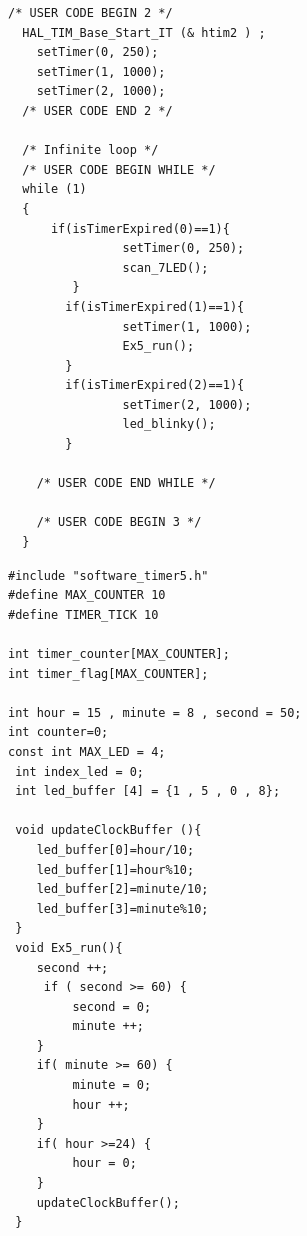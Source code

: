 \begin{lstlisting}[caption=main.c]
/* USER CODE BEGIN 2 */
  HAL_TIM_Base_Start_IT (& htim2 ) ;
    setTimer(0, 250);
    setTimer(1, 1000);
    setTimer(2, 1000);
  /* USER CODE END 2 */

  /* Infinite loop */
  /* USER CODE BEGIN WHILE */
  while (1)
  {
	  if(isTimerExpired(0)==1){
	  	 	  	setTimer(0, 250);
	  	 	  	scan_7LED();
	  	 }
	  	if(isTimerExpired(1)==1){
	  		  	setTimer(1, 1000);
	  		  	Ex5_run();
	  	}
	  	if(isTimerExpired(2)==1){
	  		  	setTimer(2, 1000);
	  		  	led_blinky();
	  	}

    /* USER CODE END WHILE */

    /* USER CODE BEGIN 3 */
  }
\end{lstlisting}
\begin{lstlisting}[caption=software$\_$timer5.c]
#include "software_timer5.h"
#define MAX_COUNTER 10
#define TIMER_TICK 10

int timer_counter[MAX_COUNTER];
int timer_flag[MAX_COUNTER];

int hour = 15 , minute = 8 , second = 50;
int counter=0;
const int MAX_LED = 4;
 int index_led = 0;
 int led_buffer [4] = {1 , 5 , 0 , 8};

 void updateClockBuffer (){
 	led_buffer[0]=hour/10;
 	led_buffer[1]=hour%10;
 	led_buffer[2]=minute/10;
 	led_buffer[3]=minute%10;
 }
 void Ex5_run(){
 	second ++;
 	 if ( second >= 60) {
 		 second = 0;
 		 minute ++;
 	}
 	if( minute >= 60) {
 		 minute = 0;
 		 hour ++;
 	}
 	if( hour >=24) {
 		 hour = 0;
 	}
 	updateClockBuffer();
 }


\end{lstlisting}
